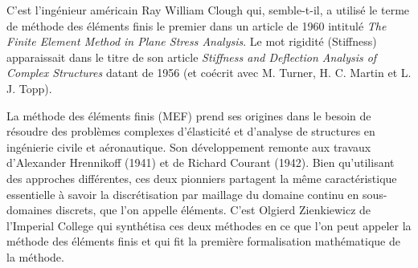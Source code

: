\medskip
\begin{histoire}%
C'est l'ingénieur américain Ray William Clough qui, semble-t-il, a utilisé le terme de méthode des éléments finis le premier dans un article de 1960 intitulé \emph{The Finite Element Method in Plane Stress Analysis}. Le mot rigidité (Stiffness) apparaissait dans le titre de son article \emph{Stiffness and Deflection Analysis of Complex Structures} datant de 1956 (et coécrit avec M. Turner, H. C. Martin et L. J. Topp).

\medskip
{}

\medskip
La méthode des éléments finis (MEF) prend ses origines dans le besoin de résoudre des problèmes complexes d'élasticité et d'analyse de structures en ingénierie civile et aéronautique. Son développement remonte aux travaux d'Alexander Hrennikoff (1941) et de Richard Courant (1942). Bien qu'utilisant des approches différentes, ces deux pionniers partagent la même caractéristique essentielle à savoir la discrétisation par maillage du domaine continu en sous-domaines discrets, que l'on appelle éléments. C'est Olgierd Zienkiewicz de l'Imperial College qui synthétisa ces deux méthodes en ce que l'on peut appeler la méthode des éléments finis et qui fit la première formalisation mathématique de la méthode.


\end{histoire}
